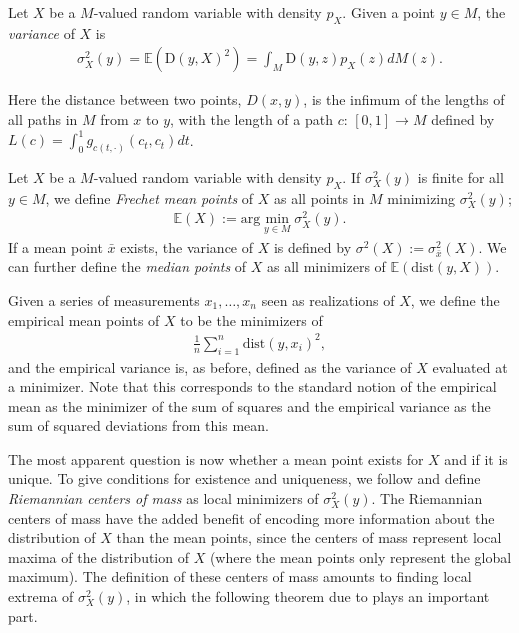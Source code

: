 \begin{definition}
  \label{def:variance}
Let $X$ be a $M$-valued random variable with density $p_X$. Given a point $y \in M$, the \textit{variance} of $X$ is
\begin{align*}
\sigma^2_X (y) = \mathbb{E} ( \text{D} (y,X)^2 ) = \int_M \text{D} (y,z) p_X(z) dM(z).
\end{align*}
\end{definition}

Here the distance between two points, $D(x,y)$, is the infimum of the lengths of all paths in $M$ from $x$ to $y$, with the length of a path $c: \, [0,1] \rightarrow M$ defined by $L(c) = \int_0^1 g_{c(t, \cdot)} (c_t, c_t) dt$.

\begin{definition}
Let $X$ be a $M$-valued random variable with density $p_X$. If $\sigma^2_X (y)$ is finite for all $y \in M$, we define \textit{Frechet mean points} of $X$ as all points in $M$ minimizing $\sigma^2_X (y)$;
\begin{align*}
\mathbb{E} (X) := \text{arg} \min_{y \in M} \sigma^2_X (y).
\end{align*}
If a mean point $\bar{x}$ exists, the variance of $X$ is defined by $\sigma^2 (X) := \sigma^2_{\bar{x}} (X)$. We can further define the \textit{median points} of $X$ as all minimizers of $\mathbb{E} ( \text{dist} (y,X))$.
\end{definition}

\begin{note}
Given a series of measurements $x_1, \ldots , x_n$ seen as realizations of $X$, we define the empirical mean points of $X$ to be the minimizers of
\begin{align*}
\frac{1}{n} \sum_{i = 1}^n \text{dist}(y, x_i)^2,
\end{align*}
and the empirical variance is, as before, defined as the variance of $X$ evaluated at a minimizer. Note that this corresponds to the standard notion of the empirical mean as the minimizer of the sum of squares and the empirical variance as the sum of squared deviations from this mean.
\end{note}

The most apparent question is now whether a mean point exists for $X$ and if it is unique. To give conditions for existence and uniqueness, we follow \cite{karcher1977center} and define \textit{Riemannian centers of mass} as local minimizers of $\sigma_X^2 (y)$. The Riemannian centers of mass have the added benefit of encoding more information about the distribution of $X$ than the mean points, since the centers of mass represent local maxima of the distribution of $X$ (where the mean points only represent the global maximum). The definition of these centers of mass amounts to finding local extrema of $\sigma_X^2 (y)$, in which the following theorem due to \cite{pennec2006intrinsic} plays an important part.

